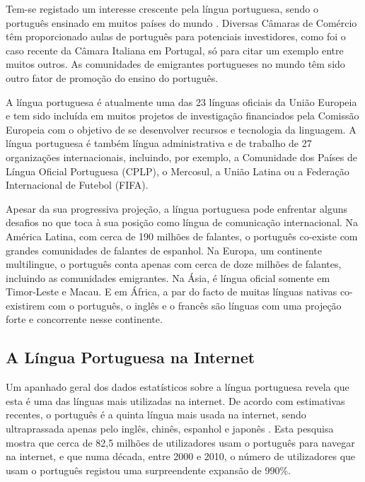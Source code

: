 \begin{multicols}{2}
Tem-se registado um interesse crescente pela língua portuguesa, sendo o português ensinado em muitos países do mundo \cite{camoes2}. 
Diversas Câmaras de Comércio têm proporcionado aulas de português para potenciais investidores, 
como foi o caso recente da Câmara Italiana em Portugal, só para citar um exemplo entre muitos outros. As comunidades de emigrantes portugueses no mundo têm sido 
outro fator de promoção do ensino do português.


A língua portuguesa é atualmente uma das 23 línguas oficiais da União Europeia e tem sido incluída em muitos projetos de investigação financiados pela Comissão Europeia com o objetivo de se desenvolver recursos e tecnologia da linguagem. 
A língua portuguesa é também língua administrativa e de trabalho de 27 organizações internacionais, incluindo, por exemplo, a Comunidade dos Países de Língua Oficial Portuguesa (CPLP), o Mercosul, a União Latina ou a Federação Internacional de Futebol (FIFA). 


Apesar da sua progressiva projeção, a língua portuguesa pode enfrentar alguns desafios no que toca à sua posição como língua de comunicação internacional. 
Na América Latina, com cerca de 190 milhões de falantes, o português co-existe com grandes comunidades de falantes de espanhol. Na Europa, 
um continente multilingue, o português conta apenas com cerca de doze milhões de falantes, incluindo as comunidades e\-mi\-gran\-tes. 
Na Ásia, é língua oficial somente em Timor-Leste e Macau. E em África, a par do facto de muitas línguas nativas co-existirem com o português, 
o inglês e o francês são línguas com uma  projeção forte e concorrente nesse continente.



\subsection{A Língua Portuguesa na Internet}

 Um apanhado geral dos dados estatísticos sobre a língua portuguesa revela que esta é uma das línguas mais utilizadas na internet. De acordo com estimativas recentes, 
o português é a quinta língua mais usada na internet, sendo ultraprassada apenas pelo inglês, chinês, espanhol e japonês \cite{twtrcon}. 
Esta pesquisa mostra que cerca de 82,5 milhões de utilizadores usam o português para navegar na internet, e que numa década, entre 2000 e 2010, 
o número de utilizadores que usam o português registou uma surpreendente expansão de 990\%.


\end{multicols}
